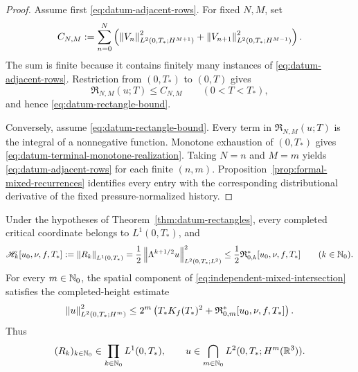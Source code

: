 \begin{proof}
Assume first \eqref{eq:datum-adjacent-rows}.  For fixed \(N,M\), set
\[
 C_{N,M}:=
 \sum_{n=0}^{N}\left(
  \left\lVert V_n\right\rVert_{L^2(0,T_*;H^{M+1})}^2
  +\left\lVert V_{n+1}\right\rVert_{L^2(0,T_*;H^{M-1})}^2
 \right).
\]
The sum is finite because it contains finitely many instances of
\eqref{eq:datum-adjacent-rows}.  Restriction from \((0,T_*)\) to \((0,T)\)
gives
\[
 \mathfrak R_{N,M}(u;T)\le C_{N,M}
 \qquad(0<T<T_*),
\]
and hence \eqref{eq:datum-rectangle-bound}.

Conversely, assume \eqref{eq:datum-rectangle-bound}.  Every term in
\(\mathfrak R_{N,M}(u;T)\) is the integral of a nonnegative function.
Monotone exhaustion of \((0,T_*)\) gives
\eqref{eq:datum-terminal-monotone-realization}.  Taking \(N=n\) and \(M=m\)
yields \eqref{eq:datum-adjacent-rows} for each finite \((n,m)\).
Proposition~\ref{prop:formal-mixed-recurrences} identifies every entry with
the corresponding distributional derivative of the fixed pressure-normalized
history.
\end{proof}

\begin{corollary}
\label{cor:datum-critical-height-completion}
Under the hypotheses of Theorem~\ref{thm:datum-rectangles}, every completed
critical coordinate belongs to \(L^1(0,T_*)\), and
\begin{equation}
 \mathscr H_k[u_0,\nu,f,T_*]
 :=\left\lVert R_k\right\rVert_{L^1(0,T_*)}
 =\frac12\left\lVert \Lambda^{k+1/2}u\right\rVert_{L^2(0,T_*;L^2)}^2
 \le\frac12\mathfrak R_{0,k}^*[u_0,\nu,f,T_*]
 \qquad(k\in\mathbb N_0).
 \label{eq:datum-completed-height-bound}
\end{equation}
For every \(m\in\mathbb N_0\), the spatial component of
\eqref{eq:independent-mixed-intersection} satisfies the completed-height estimate
\begin{equation}
 \left\lVert u\right\rVert_{L^2(0,T_*;H^m)}^2
 \le
 2^m\left(
  T_*K_f(T_*)^2+\mathfrak R_{0,m}^*[u_0,\nu,f,T_*]
 \right).
 \label{eq:datum-height-to-spatial-column}
\end{equation}
Thus
\begin{equation}
 (R_k)_{k\in\mathbb N_0}\in\prod_{k\in\mathbb N_0}L^1(0,T_*),
 \qquad
 u\in\bigcap_{m\in\mathbb N_0}L^2(0,T_*;H^m(\mathbb R^3)).
 \label{eq:datum-complete-height-and-spatial-columns}
\end{equation}
\end{corollary}


